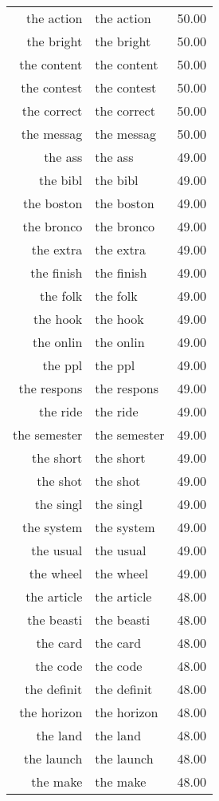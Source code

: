 \begin{table}[ht]
\begin{tabular}{rlr}
  the action & the action & 50.00 \\ 
  the bright & the bright & 50.00 \\ 
  the content & the content & 50.00 \\ 
  the contest & the contest & 50.00 \\ 
  the correct & the correct & 50.00 \\ 
  the messag & the messag & 50.00 \\ 
  the ass & the ass & 49.00 \\ 
  the bibl & the bibl & 49.00 \\ 
  the boston & the boston & 49.00 \\ 
  the bronco & the bronco & 49.00 \\ 
  the extra & the extra & 49.00 \\ 
  the finish & the finish & 49.00 \\ 
  the folk & the folk & 49.00 \\ 
  the hook & the hook & 49.00 \\ 
  the onlin & the onlin & 49.00 \\ 
  the ppl & the ppl & 49.00 \\ 
  the respons & the respons & 49.00 \\ 
  the ride & the ride & 49.00 \\ 
  the semester & the semester & 49.00 \\ 
  the short & the short & 49.00 \\ 
  the shot & the shot & 49.00 \\ 
  the singl & the singl & 49.00 \\ 
  the system & the system & 49.00 \\ 
  the usual & the usual & 49.00 \\ 
  the wheel & the wheel & 49.00 \\ 
  the article & the article & 48.00 \\ 
  the beasti & the beasti & 48.00 \\ 
  the card & the card & 48.00 \\ 
  the code & the code & 48.00 \\ 
  the definit & the definit & 48.00 \\ 
  the horizon & the horizon & 48.00 \\ 
  the land & the land & 48.00 \\ 
  the launch & the launch & 48.00 \\ 
  the make & the make & 48.00 \\ 

\end{tabular}
\end{table}
